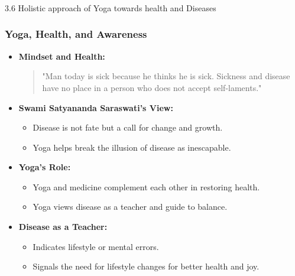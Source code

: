 \begin{frame}[fragile]\frametitle{}
\begin{center}
{\Large 3.6 Holistic approach of Yoga towards health and Diseases}
\end{center}
\end{frame}

\begin{frame}[fragile]\frametitle{Yoga, Health, and Awareness}

      \begin{itemize}
        \item \textbf{Mindset and Health:} 
        \begin{quote}
        "Man today is sick because he thinks he is sick. Sickness and disease have no place in a person who does not accept self-laments." 
        \end{quote}
        \item \textbf{Swami Satyananda Saraswati's View:}
        \begin{itemize}
            \item Disease is not fate but a call for change and growth.
            \item Yoga helps break the illusion of disease as inescapable.
        \end{itemize}
        \item \textbf{Yoga's Role:}
        \begin{itemize}
            \item Yoga and medicine complement each other in restoring health.
            \item Yoga views disease as a teacher and guide to balance.
        \end{itemize}
        \item \textbf{Disease as a Teacher:}
        \begin{itemize}
            \item Indicates lifestyle or mental errors.
            \item Signals the need for lifestyle changes for better health and joy.
        \end{itemize}
      \end{itemize}

\end{frame}

